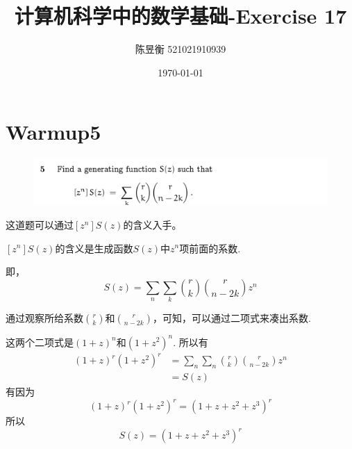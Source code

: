 \documentclass[]{article}
\title{计算机科学中的数学基础-Exercise 17}
\author{陈昱衡 521021910939}
\date{\today}
\begin{document}
\maketitle


\section*{Warmup5}
\begin{figure}[H]
\includegraphics[scale = 0.3]{2023-04-20-11-38-49.png}
\end{figure}
这道题可以通过$[z^n]S(z)$的含义入手。\par 
$[z^n]S(z)$的含义是生成函数$S(z)$中$z^n$项前面的系数.\par
即，
\begin{equation}
    S(z) = \sum_{n}\sum_{k}\binom{r}{k}\binom{r}{n-2k}z^n
\end{equation}
\par 
通过观察所给系数$\binom{r}{k}$和$\binom{r}{n-2k}$，可知，可以通过二项式来凑出系数.\par
这两个二项式是$(1+z)^n$和$(1+z^2)^n$.
所以有
\begin{align}
    (1+z)^r(1+z^2)^r& = \sum_{n}\sum_{n}\binom{r}{k}\binom{r}{n-2k}z^n\\
    &=S(z)
\end{align}
有因为
\begin{equation}
    (1+z)^r(1+z^2)^r = (1+z+z^2+z^3)^r
\end{equation}
所以
\begin{equation}
    S(z) = (1+z+z^2+z^3)^r
\end{equation}
\end{document}
